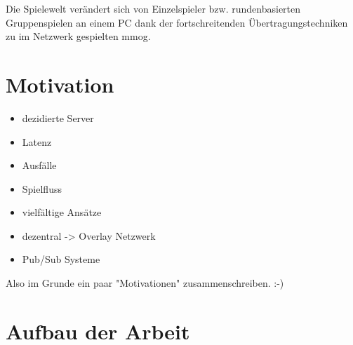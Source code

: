 Die Spielewelt verändert sich von Einzelspieler bzw. rundenbasierten Gruppenspielen an einem PC dank der fortschreitenden Übertragungstechniken zu im Netzwerk gespielten \ac{mmog}.

\section{Motivation}
\begin{itemize}
\item dezidierte Server
\item Latenz
\item Ausfälle
\item Spielfluss
\end{itemize}

\begin{itemize}
\item vielfältige Ansätze \cite{Bharambe2008Donnybrook} %
\item dezentral -> Overlay Netzwerk
\item Pub/Sub Systeme \cite{Knutsson2004Peertopeer} %
\end{itemize}

Also im Grunde ein paar "Motivationen" zusammenschreiben. :-)

\section{Aufbau der Arbeit}
